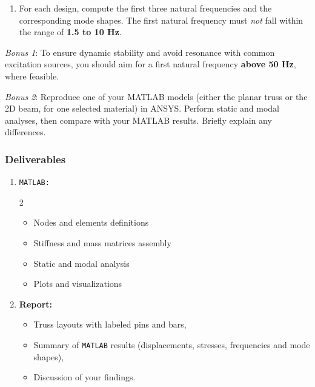 \documentclass[12pt]{article}
\begin{document}
\begin{enumerate}
  \item[3.] For each design, compute the first three natural frequencies and the corresponding mode shapes. The first natural frequency must \emph{not} fall within the range of \textbf{1.5 to 10 Hz}.
\end{enumerate}

\emph{Bonus 1}: To ensure dynamic stability and avoid resonance with common excitation sources, you should aim for a first natural frequency \textbf{above 50 Hz}, where feasible.

\emph{Bonus 2}: Reproduce one of your MATLAB models (either the planar truss or the 2D beam, for one selected material) in ANSYS. Perform static and modal analyses, then compare with your MATLAB results. Briefly explain any differences.


\subsubsection*{Deliverables}
\begin{enumerate}
  \item \texttt{MATLAB:}
        \begin{multicols}{2}
          \begin{itemize}
            \item Nodes and elements definitions
            \item Stiffness and mass matrices assembly
            \item Static and modal analysis
            \item Plots and visualizations
          \end{itemize}
        \end{multicols}


  \item \textbf{Report:}
        \begin{itemize}
          \item Truss layouts with labeled pins and bars,
          \item Summary of \texttt{MATLAB} results (displacements, stresses, frequencies and mode shapes),
          \item Discussion of your findings.
        \end{itemize}
\end{enumerate}
\end{document}
